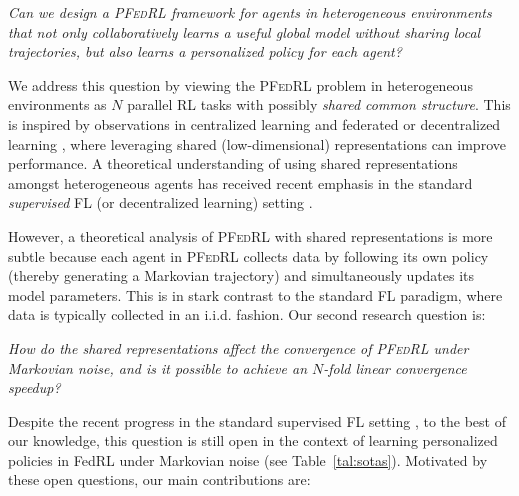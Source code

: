 \documentclass{article} %
\theoremstyle{plain}
\theoremstyle{definition}
\theoremstyle{remark}
\newcommand{\PFRL}{\textsc{PFedRL}\xspace}
\begin{document}
\vspace{-0.1in}
\begin{tcolorbox}[colback=white!5!white,colframe=white!75!white]
\textit{Can we design a \PFRL framework for agents in heterogeneous environments that not only collaboratively learns a useful global model without sharing local trajectories, but also learns a personalized policy for each agent? 
}
\end{tcolorbox}
\vspace{-0.1in}

We address this question by viewing the \PFRL problem in heterogeneous environments as $N$ parallel RL tasks with possibly \emph{shared common structure}. This is inspired by observations in centralized learning \citep{bengio2013representation,lecun2015deep} and federated or decentralized learning \citep{collins2021exploiting,tziotis2023straggler,xiong2023deprl}, where leveraging shared (low-dimensional) representations can improve performance. A theoretical understanding of using shared representations amongst heterogeneous agents has received recent emphasis in the standard \emph{supervised} FL (or decentralized learning) setting \citep{collins2021exploiting,tziotis2023straggler,xiong2023deprl}. 


 However, a theoretical analysis of \PFRL with shared representations is more subtle because each agent in \PFRL collects data by following its own policy (thereby generating a Markovian trajectory) and simultaneously updates its model parameters. This is in stark contrast to the standard FL paradigm, where data is typically collected in an i.i.d. fashion. Our second research question is:


\vspace{-0.1in}
\begin{tcolorbox}[colback=white!5!white,colframe=white!75!white]
\textit{How do the shared representations affect the convergence of \PFRL under Markovian noise, and is it possible to achieve an $N$-fold linear convergence speedup? }
\end{tcolorbox}
\vspace{-0.1in}


Despite the recent progress in the standard supervised FL setting \citep{collins2021exploiting,tziotis2023straggler,xiong2023deprl}, to the best of our knowledge, this question is still open in the context of learning personalized policies in FedRL under Markovian noise (see Table~\ref{tal:sotas}). 
Motivated by these open questions, our main contributions are:
\end{document}
